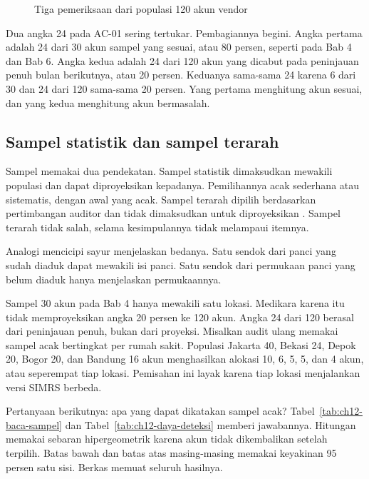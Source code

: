 \begin{figure}[!htb]
  \centering
  
  \caption{Tiga pemeriksaan dari populasi 120 akun vendor}
  \label{fig:ch12-populasi-sampel}
\end{figure}

Dua angka 24 pada AC-01 sering tertukar. Pembagiannya begini. Angka pertama adalah 24 dari 30 akun
sampel yang sesuai, atau 80 persen, seperti pada Bab 4 dan Bab 6. Angka kedua adalah 24 dari 120
akun yang dicabut pada peninjauan penuh bulan berikutnya, atau 20 persen. Keduanya sama-sama 24
karena 6 dari 30 dan 24 dari 120 sama-sama 20 persen. Yang pertama menghitung akun sesuai, dan yang
kedua menghitung akun bermasalah.

\subsection*{Sampel statistik dan sampel terarah}

Sampel memakai dua pendekatan. Sampel statistik dimaksudkan mewakili populasi dan dapat
diproyeksikan kepadanya. Pemilihannya acak sederhana atau sistematis, dengan awal yang acak. Sampel
terarah dipilih berdasarkan pertimbangan auditor dan tidak dimaksudkan untuk diproyeksikan
\cite{c12-fiscam2026}. Sampel terarah tidak salah, selama kesimpulannya tidak melampaui itemnya.

Analogi mencicipi sayur menjelaskan bedanya. Satu sendok dari panci yang sudah diaduk dapat mewakili
isi panci. Satu sendok dari permukaan panci yang belum diaduk hanya menjelaskan permukaannya.

Sampel 30 akun pada Bab 4 hanya mewakili satu lokasi. Medikara karena itu tidak memproyeksikan
angka 20 persen ke 120 akun. Angka 24 dari 120 berasal dari peninjauan penuh, bukan dari proyeksi.
Misalkan audit ulang memakai sampel acak bertingkat per rumah sakit. Populasi Jakarta 40, Bekasi
24, Depok 20, Bogor 20, dan Bandung 16 akun menghasilkan alokasi 10, 6, 5, 5, dan 4 akun, atau
seperempat tiap lokasi. Pemisahan ini layak karena tiap lokasi menjalankan versi SIMRS berbeda.

Pertanyaan berikutnya: apa yang dapat dikatakan sampel acak? Tabel~\ref{tab:ch12-baca-sampel} dan
Tabel~\ref{tab:ch12-daya-deteksi} memberi jawabannya. Hitungan memakai sebaran hipergeometrik karena
akun tidak dikembalikan setelah terpilih. Batas bawah dan batas atas masing-masing memakai keyakinan
95 persen satu sisi. Berkas  memuat seluruh
hasilnya.

